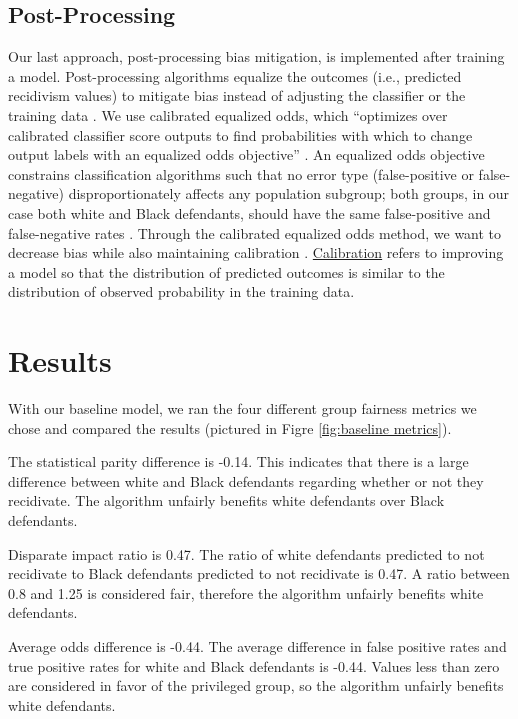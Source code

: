 \documentclass[water,article,submit,moreauthors,pdftex]{mdpi}
\begin{document}
\hypertarget{post-processing}{%
\subsection{Post-Processing}\label{post-processing}}

Our last approach, post-processing bias mitigation, is implemented after
training a model. Post-processing algorithms equalize the outcomes
(i.e., predicted recidivism values) to mitigate bias instead of
adjusting the classifier or the training data \citep{baxter2021AI}. We
use calibrated equalized odds, which ``optimizes over calibrated
classifier score outputs to find probabilities with which to change
output labels with an equalized odds objective''
\citep{aif360-oct-2018}. An equalized odds objective constrains
classification algorithms such that no error type (false-positive or
false-negative) disproportionately affects any population subgroup; both
groups, in our case both white and Black defendants, should have the
same false-positive and false-negative rates \citep{pleiss2017fairness}.
Through the calibrated equalized odds method, we want to decrease bias
while also maintaining calibration \citep{pleiss2017fairness}.
\href{https://medium.com/analytics-vidhya/calibration-in-machine-learning-e7972ac93555}{Calibration}
refers to improving a model so that the distribution of predicted
outcomes is similar to the distribution of observed probability in the
training data.

\hypertarget{results}{%
\section{Results}\label{results}}

With our baseline model, we ran the four different group fairness
metrics we chose and compared the results (pictured in Figre
\ref{fig:baseline metrics}).

The statistical parity difference is -0.14. This indicates that there is
a large difference between white and Black defendants regarding whether
or not they recidivate. The algorithm unfairly benefits white defendants
over Black defendants.

Disparate impact ratio is 0.47. The ratio of white defendants predicted
to not recidivate to Black defendants predicted to not recidivate is
0.47. A ratio between 0.8 and 1.25 is considered fair, therefore the
algorithm unfairly benefits white defendants.

Average odds difference is -0.44. The average difference in false
positive rates and true positive rates for white and Black defendants is
-0.44. Values less than zero are considered in favor of the privileged
group, so the algorithm unfairly benefits white defendants.
\end{document}
